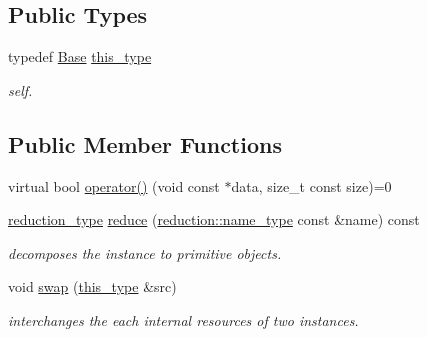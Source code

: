 \subsection*{Public Types}
\begin{DoxyCompactItemize}
\item 
\hypertarget{classhryky_1_1writer_1_1_base_a2da49d5140295f9ae7f5f27c9677278e}{typedef \hyperlink{classhryky_1_1writer_1_1_base}{Base} \hyperlink{classhryky_1_1writer_1_1_base_a2da49d5140295f9ae7f5f27c9677278e}{this\-\_\-type}}\label{classhryky_1_1writer_1_1_base_a2da49d5140295f9ae7f5f27c9677278e}

\begin{DoxyCompactList}\small\item\em self. \end{DoxyCompactList}\end{DoxyCompactItemize}
\subsection*{Public Member Functions}
\begin{DoxyCompactItemize}
\item 
virtual bool \hyperlink{classhryky_1_1writer_1_1_base_a19d3bc3fa440d45dbbee33475c3916c3}{operator()} (void const $\ast$data, size\-\_\-t const size)=0
\item 
\hypertarget{classhryky_1_1writer_1_1_base_a2809ad5f75abd2266e6804e90094bc05}{\hyperlink{namespacehryky_a343a9a4c36a586be5c2693156200eadc}{reduction\-\_\-type} \hyperlink{classhryky_1_1writer_1_1_base_a2809ad5f75abd2266e6804e90094bc05}{reduce} (\hyperlink{namespacehryky_1_1reduction_ac686c30a4c8d196bbd0f05629a6b921f}{reduction\-::name\-\_\-type} const \&name) const }\label{classhryky_1_1writer_1_1_base_a2809ad5f75abd2266e6804e90094bc05}

\begin{DoxyCompactList}\small\item\em decomposes the instance to primitive objects. \end{DoxyCompactList}\item 
\hypertarget{classhryky_1_1writer_1_1_base_ab2b137d16fbe40d839ee136bd5304cab}{void \hyperlink{classhryky_1_1writer_1_1_base_ab2b137d16fbe40d839ee136bd5304cab}{swap} (\hyperlink{classhryky_1_1writer_1_1_base_a2da49d5140295f9ae7f5f27c9677278e}{this\-\_\-type} \&src)}\label{classhryky_1_1writer_1_1_base_ab2b137d16fbe40d839ee136bd5304cab}

\begin{DoxyCompactList}\small\item\em interchanges the each internal resources of two instances. \end{DoxyCompactList}\end{DoxyCompactItemize}
